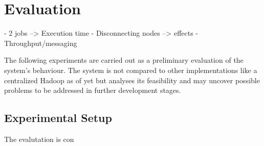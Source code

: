 \chapter{Evaluation}

- 2 jobs --> Execution time
- Disconnecting nodes --> effects
- Throughput/messaging

The following experiments are carried out as a preliminary evaluation of the system's behaviour. The system is not compared to other implementations like a centralized Hadoop as of yet but analyses its feasibility and may uncover possible problems to be addressed in further development stages.

\section{Experimental Setup}
The evalutation is con